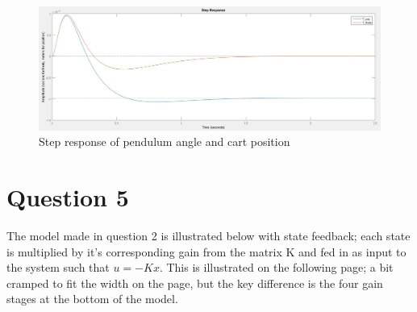 \documentclass[12pt]{article}
\begin{document}
\begin{center}
\begin{figure}[htb]
	\includegraphics[width=1\textwidth]{PBA3_time_response.jpg}
\caption{Step response of pendulum angle and cart position}
\end{figure}
\end{center}



\clearpage


\section{Question 5}
The model made in question 2 is illustrated below with state feedback; each state is multiplied by it's corresponding gain from the matrix K and fed in as input to the system such that $u = -K x$. This is illustrated on the following page; a bit cramped to fit the width on the page, but the key difference is the four gain stages at the bottom of the model.
\end{document}
